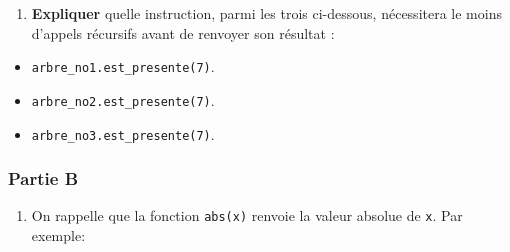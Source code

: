 \begin{Shaded}
\begin{Highlighting}[]
 
    
       
   \OperatorTok{==} 
       
   \OperatorTok{\textless{}} 
       
   \NormalTok{ :}
       
\end{Highlighting}
\end{Shaded}

\begin{enumerate}
\def\labelenumi{\arabic{enumi}.}
\setcounter{enumi}{7}
\tightlist
\item
  \textbf{Expliquer} quelle instruction, parmi les trois ci-dessous,
  nécessitera le moins d'appels récursifs avant de renvoyer son résultat
  :
\end{enumerate}

\begin{itemize}
\tightlist
\item
  \texttt{arbre\_no1.est\_presente(7)}.
\item
  \texttt{arbre\_no2.est\_presente(7)}.
\item
  \texttt{arbre\_no3.est\_presente(7)}.
\end{itemize}

\subsubsection{Partie B}\label{partie-b}

\begin{enumerate}
\def\labelenumi{\arabic{enumi}.}
\setcounter{enumi}{8}
\tightlist
\item
  On rappelle que la fonction \texttt{abs(x)} renvoie la valeur absolue
  de \texttt{x}. Par exemple:
\end{enumerate}

\begin{Shaded}
\begin{Highlighting}[]
\OperatorTok{\textgreater{}\textgreater{}\textgreater{}} \NormalTok{(}\NormalTok{)}
\OperatorTok{\textgreater{}\textgreater{}\textgreater{}} \NormalTok{(}\OperatorTok{{-}}\NormalTok{)}
\end{Highlighting}
\end{Shaded}

